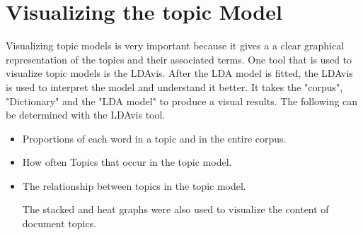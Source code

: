 \section{Visualizing the topic Model}
Visualizing topic models is very important because it gives a
a clear graphical representation of the topics and their associated  terms. One  tool that is used to visualize topic models is the LDAvis. After the LDA model is fitted, the LDAvis is used to interpret the model and understand it better. It takes the "corpus", "Dictionary" and the "LDA model" to produce a visual results. The following can be determined with the LDAvis tool.
\begin{itemize}
\item Proportions of each word in a topic and in the entire corpus.
\item How often Topics that occur in the topic model.
\item The relationship between topics in the topic model.

The stacked and heat graphs were also used to visualize  the content of document topics.
\end{itemize}


